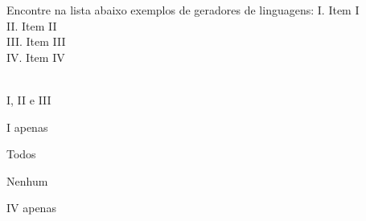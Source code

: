 \question[10]
Encontre na lista abaixo exemplos de geradores de linguagens:
I. Item I\\
II. Item II\\
III. Item III\\
IV. Item IV\\
\\
\begin{choices}
\item I, II e III
\item I apenas %
\item Todos
\item Nenhum
\item IV apenas
\end{choices}
\answerline


